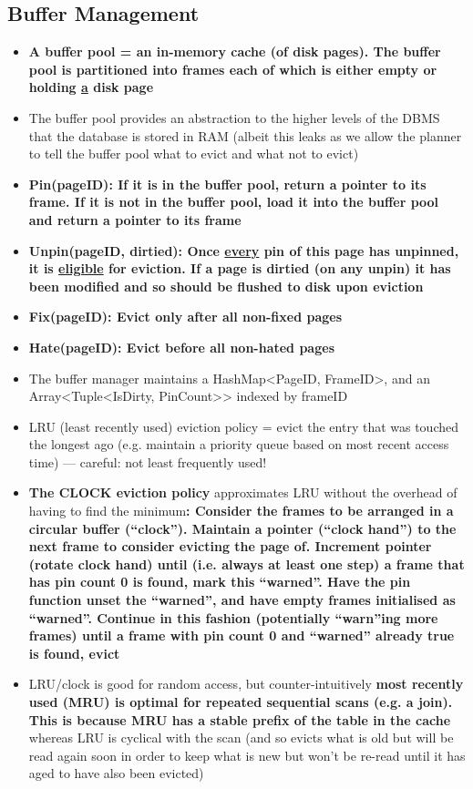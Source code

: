 \documentclass[20pt,a4paper,landscape]{extarticle}
\begin{document}
\begin{flushleft}
\subsection{Buffer Management}
\begin{itemize}
\item \textbf{A buffer pool = an in-memory cache (of disk pages). The buffer pool is partitioned into frames each of which is either empty or holding \underline{a} disk page}
\item The buffer pool provides an abstraction to the higher levels of the DBMS that the database is stored in RAM (albeit this leaks as we allow the planner to tell the buffer pool what to evict and what not to evict)
\item \textbf{Pin(pageID): If it is in the buffer pool, return a pointer to its frame. If it is not in the buffer pool, load it into the buffer pool and return a pointer to its frame}
\item \textbf{Unpin(pageID, dirtied): Once \underline{every} pin of this page has unpinned, it is \underline{eligible} for eviction. If a page is dirtied (on any unpin) it has been modified and so should be flushed to disk upon eviction}
\item \textbf{Fix(pageID): Evict only after all non-fixed pages}
\item \textbf{Hate(pageID): Evict before all non-hated pages}
\item The buffer manager maintains a HashMap<PageID, FrameID>, and an Array<Tuple<IsDirty, PinCount>{}> indexed by frameID
\item LRU (least recently used) eviction policy = evict the entry that was touched the longest ago (e.g. maintain a priority queue based on most recent access time) --- careful: not least frequently used!
\item \textbf{The CLOCK eviction policy} approximates LRU without the overhead of having to find the minimum\textbf{: Consider the frames to be arranged in a circular buffer (``clock''). Maintain a pointer (``clock hand'') to the next frame to consider evicting the page of. Increment pointer (rotate clock hand) until (i.e. always at least one step) a frame that has pin count 0 is found, mark this ``warned''. Have the pin function unset the ``warned'', and have  empty frames initialised as ``warned''. Continue in this fashion (potentially ``warn''ing more frames) until a frame with pin count 0 and ``warned'' already true is found, evict}
\item LRU/clock is good for random access, but counter-intuitively \textbf{most recently used (MRU) is optimal for repeated sequential scans (e.g. a join). This is because MRU has a stable prefix of the table in the cache} whereas LRU is cyclical with the scan (and so evicts what is old but will be read again soon in order to keep what is new but won't be re-read until it has aged to have also been evicted)
\end{itemize}

\end{flushleft}
\end{document}
